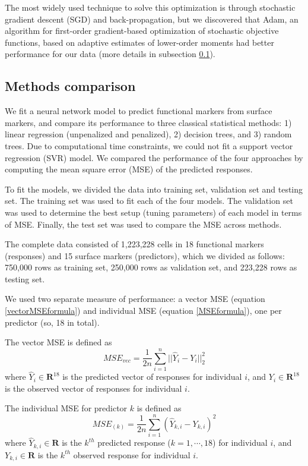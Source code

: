 \documentclass[conference]{IEEEtran}
\begin{document}
The most widely used technique to solve this optimization is through
stochastic gradient descent (SGD) and back-propagation, but we
discovered that Adam\cite{Kingma2014}, an algorithm for first-order
gradient-based optimization of stochastic objective functions, based
on adaptive estimates of lower-order moments had better performance
for our data (more details in subsection \ref{comparison}).


\subsection{Methods comparison}
\label{comparison}

We fit a neural network model to predict functional markers from
surface markers, and compare its performance to three classical
statistical methods: 1) linear regression (unpenalized and penalized),
2) decision trees, and 3) random trees. Due to computational time
constraints, we could not fit a support vector regression (SVR)
model. We compared the performance of the four approaches by computing
the mean square error (MSE) of the predicted responses.

To fit the models, we divided the data into training set, validation
set and testing set. The training set was used to fit each of the four
models. The validation set was used to determine the best setup
(tuning parameters) of each model in terms of MSE. Finally, the test
set was used to compare the MSE across methods.

The complete data consisted of 1,223,228 cells in 18 functional
markers (responses) and 15 surface markers (predictors), which we
divided as follows: 750,000 rows as training set, 250,000 rows as
validation set, and 223,228 rows as testing set.

We used two separate measure of performance: a vector MSE (equation
\ref{vectorMSEformula}) and individual MSE (equation
\ref{MSEformula}), one per predictor (so, 18 in total).

The vector MSE is defined as
\begin{equation}
MSE_{vec} = \frac{1}{2n} \sum_{i=1}^n ||\hat{Y}_i - Y_i ||^2_2
\label{vectorMSEformula}
\end{equation}
where $\hat{Y}_i \in \mathbf{R}^{18}$ is the predicted vector of
responses for individual $i$, and $Y_i \in \mathbf{R}^{18}$ is the
observed vector of responses for individual $i$.

The individual MSE for predictor $k$ is defined  as
\begin{equation}
MSE_{(k)} = \frac{1}{2n} \sum_{i=1}^n (\hat{Y}_{k,i} - Y_{k,i} )^2
\label{MSEformula}
\end{equation}
where $\hat{Y}_{k,i} \in \mathbf{R}$ is the $k^{th}$ predicted
response ($k=1,\cdots,18$) for individual $i$, and $Y_{k,i} \in
\mathbf{R}$ is the $k^{th}$ observed response for individual $i$.
\end{document}
